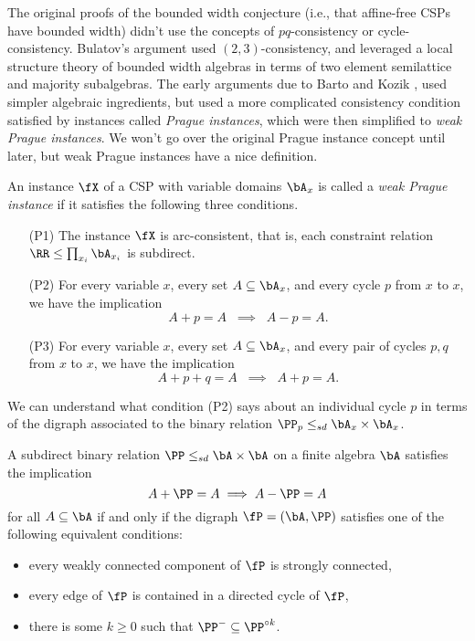 The original proofs of the bounded width conjecture (i.e., that affine-free CSPs have bounded width) didn't use the concepts of $pq$-consistency or cycle-consistency. Bulatov's argument \cite{bulatov-bounded} used $(2,3)$-consistency, and leveraged a local structure theory of bounded width algebras in terms of two element semilattice and majority subalgebras. The early arguments due to Barto and Kozik \cite{barto}, \cite{local-consistency} used simpler algebraic ingredients, but used a more complicated consistency condition satisfied by instances called \emph{Prague instances}, which were then simplified to \emph{weak Prague instances}. We won't go over the original Prague instance concept until later, but weak Prague instances have a nice definition.

\begin{defn}\label{defn-weak-prague} An instance $\fX$ of a CSP with variable domains $\bA_x$ is called a \emph{weak Prague instance} if it satisfies the following three conditions.
\begin{itemize}
\item[(P1)] The instance $\fX$ is arc-consistent, that is, each constraint relation $\RR \le \prod_{x_i} \bA_{x_i}$ is subdirect.
\item[(P2)] For every variable $x$, every set $A \subseteq \bA_x$, and every cycle $p$ from $x$ to $x$, we have the implication
\[
A + p = A \;\; \implies \;\; A - p = A.
\]
\item[(P3)] For every variable $x$, every set $A \subseteq \bA_x$, and every pair of cycles $p,q$ from $x$ to $x$, we have the implication
\[
A + p + q = A \;\; \implies \;\; A + p = A.
\]
\end{itemize}
\end{defn}

We can understand what condition (P2) says about an individual cycle $p$ in terms of the digraph associated to the binary relation $\PP_p \le_{sd} \bA_x \times \bA_x$.

\begin{prop}\label{prop-p2} A subdirect binary relation $\PP \le_{sd} \bA \times \bA$ on a finite algebra $\bA$ satisfies the implication
\[
A + \PP = A \implies A - \PP = A
\]
for all $A \subseteq \bA$ if and only if the digraph $\fP = (\bA,\PP)$ satisfies one of the following equivalent conditions:
\begin{itemize}
\item every weakly connected component of $\fP$ is strongly connected,
\item every edge of $\fP$ is contained in a directed cycle of $\fP$,
\item there is some $k \ge 0$ such that $\PP^- \subseteq \PP^{\circ k}$.
\end{itemize}
\end{prop}

